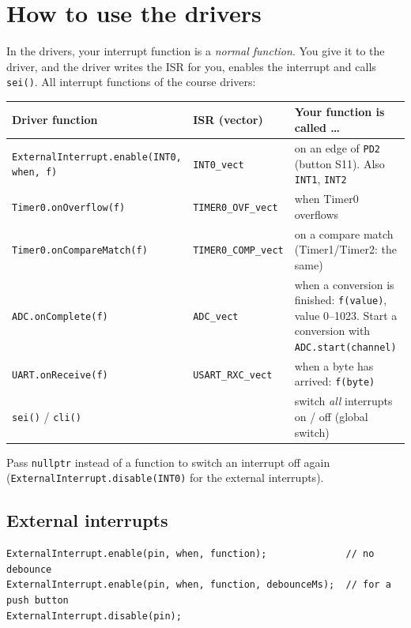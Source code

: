 \documentclass[11pt,a4paper]{article}
\newcommand{\code}[1]{\texttt{#1}}
\begin{document}
\section{How to use the drivers}

In the drivers, your interrupt function is a \emph{normal function}. You give
it to the driver, and the driver writes the ISR for you, enables the interrupt
and calls \code{sei()}. All interrupt functions of the course drivers:

\begin{center}
\small
\begin{tabularx}{\textwidth}{@{}l l >{\raggedright\arraybackslash}X@{}}
\toprule
\textbf{Driver function} & \textbf{ISR (vector)} & \textbf{Your function is called \dots} \\
\midrule
\code{ExternalInterrupt.enable(INT0, when, f)} & \code{INT0\_vect} & on an edge of \code{PD2} (button S11). Also \code{INT1}, \code{INT2} \\
\code{Timer0.onOverflow(f)}                   & \code{TIMER0\_OVF\_vect}  & when Timer0 overflows \\
\code{Timer0.onCompareMatch(f)}               & \code{TIMER0\_COMP\_vect} & on a compare match (Timer1/Timer2: the same) \\
\code{ADC.onComplete(f)}                      & \code{ADC\_vect}          & when a conversion is finished: \code{f(value)}, value 0--1023.
                                                                           Start a conversion with \code{ADC.start(channel)} \\
\code{UART.onReceive(f)}                      & \code{USART\_RXC\_vect}   & when a byte has arrived: \code{f(byte)} \\
\midrule
\code{sei()} / \code{cli()} & & switch \emph{all} interrupts on / off (global switch) \\
\bottomrule
\end{tabularx}
\end{center}

Pass \code{nullptr} instead of a function to switch an interrupt off again
(\code{ExternalInterrupt.disable(INT0)} for the external interrupts).

\subsection*{External interrupts}

\begin{lstlisting}
ExternalInterrupt.enable(pin, when, function);              // no debounce
ExternalInterrupt.enable(pin, when, function, debounceMs);  // for a push button
ExternalInterrupt.disable(pin);
\end{lstlisting}
\end{document}
